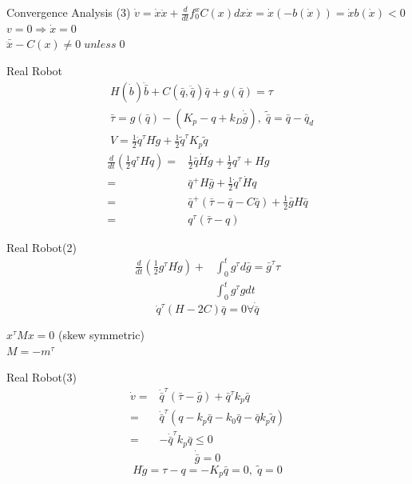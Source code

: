 \documentclass{beamer}
\begin{document}
\begin{frame}{Convergence Analysis (3)}
    $\dot{v}=\dot{x}\ddot{x} + \frac{d}{dt}f^x_0 C(x)dx \dot{x} = \dot{x}(-b(\dot{x}))=\dot{x}b(\dot{x})<0$\\
    $v=0 \Rightarrow \dot{x}=0$\\
    $\bar{\ddot{x}}-C(x) \neq 0\; unless\; 0$\\
\end{frame}

\begin{frame}{Real Robot}
    \begin{align*}
        &H(\dot{b})\ddot{\bar{b}}+ C(\bar{q},\ddot{\bar{q}})\bar{q}+g(\bar{q})=\tau\\
        &\bar{\tau}=g(\bar{q})-(K_p-q+k_D\dot{\bar{g}}), \; \tilde{\bar{q}}=\bar{q}-\bar{q}_d\\
        &V=\frac{1}{2}\dot{q}^\tau H \dot{g}+ \frac{1}{2} \tilde{q}^\tau K_p \tilde{q}
    \end{align*}
    \begin{align*}
    \frac{d}{dt}(\frac{1}{2} q^\tau H \dot{q}) =& \frac{1}{2} \bar{q} \dot{H}\dot{g}+\frac{1}{2}q^\tau +Hg\\
    =& \bar{q}^+ H\bar{g}+\frac{1}{2}\dot{q}^\tau \dot{H}\dot{q}\\
    =& \bar{q}^+ (\bar{\tau}-\bar{q}-C\bar{q})+\frac{1}{2}\bar{g}H\bar{q}\\
    =& q^\tau(\bar{\tau}-q)
    \end{align*}
\end{frame}

\begin{frame}{Real Robot(2)}
    \begin{align*}
        \frac{d}{dt} (\frac{1}{2}g^\tau H\dot{g})+&\int_0^t g^\tau d\bar{g} = \bar{g}^\tau \tau\\
        &\int_0^t g^\tau g dt
    \end{align*}
    $$\dot{q}^\tau(H-2C)\bar{q}=0\forall \dot{\bar{q}}$$

    $x^\tau Mx = 0$ (skew symmetric)\\
    $M=-m^\tau$
\end{frame}

\begin{frame}{Real Robot(3)}
    \begin{align*}
        \dot{v} =& \dot{\bar{q}}^\tau (\bar{\tau}-\bar{g})+\bar{q}^\tau k_p \bar{q}\\
        =& \dot{\bar{q}}^\tau(q-k_p \bar{q}-k_0 \bar{q}-\bar{q}k_p \tilde{q})\\
        =& -\dot{\bar{q}}^\tau k_p \bar{q} \leq 0
    \end{align*}
    $$\dot{\bar{g}}=0$$
    $$H\ddot{g}=\tau-q=-K_p\bar{q}=0, \; \tilde{q}=0$$
\end{frame}
\end{document}
